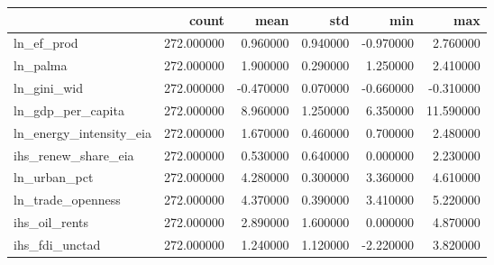 \begin{tabular}{lrrrrr}
\toprule
 & count & mean & std & min & max \\
\midrule
ln_ef_prod & 272.000000 & 0.960000 & 0.940000 & -0.970000 & 2.760000 \\
ln_palma & 272.000000 & 1.900000 & 0.290000 & 1.250000 & 2.410000 \\
ln_gini_wid & 272.000000 & -0.470000 & 0.070000 & -0.660000 & -0.310000 \\
ln_gdp_per_capita & 272.000000 & 8.960000 & 1.250000 & 6.350000 & 11.590000 \\
ln_energy_intensity_eia & 272.000000 & 1.670000 & 0.460000 & 0.700000 & 2.480000 \\
ihs_renew_share_eia & 272.000000 & 0.530000 & 0.640000 & 0.000000 & 2.230000 \\
ln_urban_pct & 272.000000 & 4.280000 & 0.300000 & 3.360000 & 4.610000 \\
ln_trade_openness & 272.000000 & 4.370000 & 0.390000 & 3.410000 & 5.220000 \\
ihs_oil_rents & 272.000000 & 2.890000 & 1.600000 & 0.000000 & 4.870000 \\
ihs_fdi_unctad & 272.000000 & 1.240000 & 1.120000 & -2.220000 & 3.820000 \\
\bottomrule
\end{tabular}
